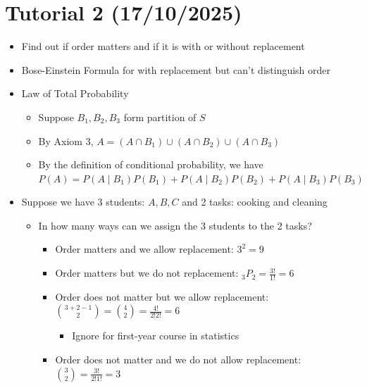 \documentclass{article}
\begin{document}
\section{Tutorial 2 (17/10/2025)}
\begin{itemize}
    \item Find out if order matters and if it is with or without replacement
    \item Bose-Einstein Formula for with replacement but can't distinguish order
    \item Law of Total Probability
    \begin{itemize}
        \item Suppose $B_1,B_2,B_3$ form partition of $S$
        \item By Axiom 3, $A = (A \cap B_1) \cup (A \cap B_2) \cup (A \cap B_3)$
        \item By the definition of conditional probability, we have $P(A) = P(A \mid B_1)P(B_1) + P(A \mid B_2)P(B_2) + P(A \mid B_3)P(B_3)$
    \end{itemize}
    \item Suppose we have 3 students: $A,B,C$ and 2 tasks: cooking and cleaning
    \begin{itemize}
        \item In how many ways can we assign the 3 students to the 2 tasks?
        \begin{itemize}
            \item Order matters and we allow replacement: $3^2 = 9$
            \item Order matters but we do not replacement: $_3P_2 = \frac{3!}{1!} = 6$
            \item Order does not matter but we allow replacement: $\binom{3+2-1}{2}=\binom{4}{2} = \frac{4!}{2!2!} = 6$
            \begin{itemize}
                \item Ignore for first-year course in statistics
            \end{itemize}
            \item Order does not matter and we do not allow replacement: $\binom{3}{2} = \frac{3!}{2!1!} = 3$
        \end{itemize}
    \end{itemize}

\end{itemize}
\end{document}
